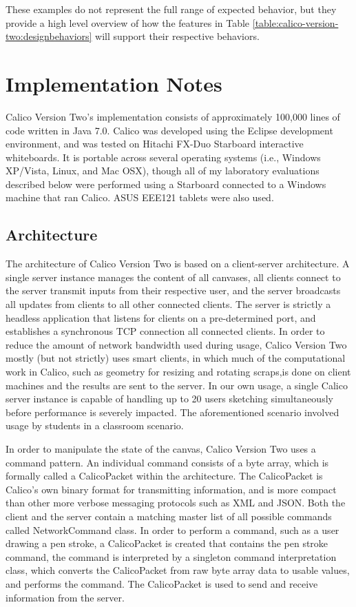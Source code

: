 These examples do not represent the full range of expected behavior, but they provide a high level overview of how the features in Table \ref{table:calico-version-two:designbehaviors} will support their respective behaviors.

\section{Implementation Notes}

Calico Version Two's implementation consists of approximately 100,000 lines of code written in Java 7.0. Calico was developed using the Eclipse development environment, and was tested on Hitachi FX-Duo Starboard interactive whiteboards. It is portable across several operating systems (i.e., Windows XP/Vista, Linux, and Mac OSX), though all of my laboratory evaluations described below were performed using a Starboard connected to a Windows machine that ran Calico. ASUS EEE121 tablets were also used.

\subsection{Architecture}

The architecture of Calico Version Two is based on a client-server architecture. A single server instance manages the content of all canvases, all clients connect to the server transmit inputs from their respective user, and the server broadcasts all updates from clients to all other connected clients. The server is strictly a headless application that listens for clients on a pre-determined port, and establishes a synchronous TCP connection all connected clients. In order to reduce the amount of network bandwidth used during usage, Calico Version Two mostly (but not strictly) uses smart clients, in which much of the computational work in Calico, such as geometry for resizing and rotating scraps,is done on client machines and the results are sent to the server. In our own usage, a single Calico server instance is capable of handling up to 20 users sketching simultaneously before performance is severely impacted. The aforementioned scenario involved usage by students in a classroom scenario.

In order to manipulate the state of the canvas, Calico Version Two uses a command pattern. An individual command consists of a byte array, which is formally called a CalicoPacket within the architecture. The CalicoPacket is Calico's own binary format for transmitting information, and is more compact than other more verbose messaging protocols such as XML and JSON. Both the client and the server contain a matching master list of all possible commands called NetworkCommand class. In order to perform a command, such as a user drawing a pen stroke, a CalicoPacket is created that contains the pen stroke command, the command is interpreted by a singleton command interpretation class, which converts the CalicoPacket from raw byte array data to usable values, and performs the command. The CalicoPacket is used to send and receive information from the server.

